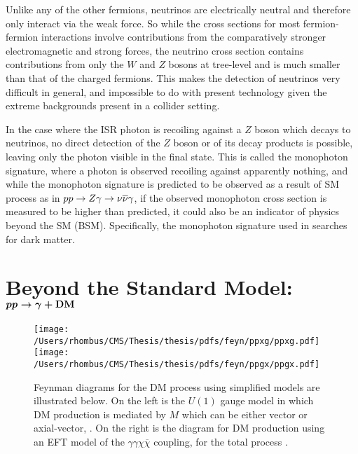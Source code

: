  Unlike any of the other fermions, 
  neutrinos are electrically neutral
  and therefore only interact via
  the weak force. 
 So while the cross sections for
  most fermion-fermion interactions involve
  contributions from the comparatively stronger
  electromagnetic and strong forces,
  the neutrino cross section contains
  contributions from only the $W$ and $Z$
  bosons at tree-level and is
  much smaller than that of the charged fermions.
 This makes the detection of neutrinos very difficult in general,
  and impossible to do with present technology
  given the extreme backgrounds present
  in a collider setting.
  
 In the case where the ISR photon is recoiling
  against a $Z$ boson which decays
  to neutrinos, 
  no direct detection of the $Z$ boson or of
  its decay products is possible,
  leaving only the photon visible in the final state.
 This is called the monophoton signature,
  where a photon is observed recoiling against
  apparently nothing, and while the
  monophoton signature is predicted to be
  observed as a result of SM process as in $pp\rightarrow Z\gamma\rightarrow\nu\overline{\nu}\gamma$,
  if the observed monophoton cross section is measured to be higher 
  than predicted, it could also be an indicator of physics beyond the SM (BSM).
 Specifically, the monophoton signature used in searches for dark matter.


 \section[Beyond the Standard Model: \ppgdm]
 {Beyond the Standard Model: $\boldsymbol{pp\rightarrow \gamma + \mathrm{DM}}$}

\begin{figure}[!h]
 \center
 \caption[Feynman diagrams for dark matter monophoton production]{
  Feynman diagrams for the DM process
   \ppgdm using simplified models
   are illustrated below.
  On the left is the $U(1)$ gauge
   model in which DM production
   is mediated by $M$ which can 
   be either vector or axial-vector,
   \ppgmgcc.
  On the right is the diagram for 
   DM production using an 
   EFT model of the $\gamma\gamma\chi\overline{\chi}$
   coupling, for the total process
   \ppggcc.
 } 
 \texttt{[image: /Users/rhombus/CMS/Thesis/thesis/pdfs/feyn/ppxg/ppxg.pdf]}
 \texttt{[image: /Users/rhombus/CMS/Thesis/thesis/pdfs/feyn/ppgx/ppgx.pdf]}
    \label{fig:ppxgfeyn}
\end{figure}

